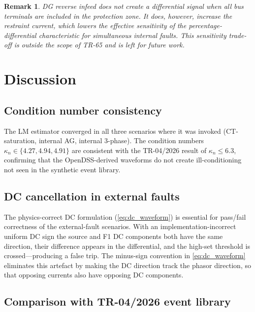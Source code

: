 \documentclass[12pt,a4paper]{article}
\newtheorem{remark}{Remark}[section]
\newcommand{\kappan}{\kappa_n}
\begin{document}
\begin{remark}
  DG reverse infeed does not create a differential signal when all bus
  terminals are included in the protection zone.  It does, however, increase
  the restraint current, which lowers the \emph{effective} sensitivity of the
  percentage-differential characteristic for simultaneous internal faults.
  This sensitivity trade-off is outside the scope of TR-65 and is left for
  future work.
\end{remark}

\section{Discussion}
\label{sec:discussion}

\subsection{Condition number consistency}
\label{sec:kappa}

The LM estimator converged in all three scenarios where it was invoked
(CT-saturation, internal AG, internal 3-phase).  The condition numbers
$\kappan \in \{4.27, 4.94, 4.91\}$ are consistent with the TR-04/2026
result of $\kappan \leq 6.3$, confirming that the OpenDSS-derived waveforms
do not create ill-conditioning not seen in the synthetic event library.

\subsection{DC cancellation in external faults}
\label{sec:dc_cancel}

The physics-correct DC formulation (\cref{eq:dc_waveform}) is essential for
pass/fail correctness of the external-fault scenarios.  With an
implementation-incorrect uniform DC sign the source and F1 DC components both
have the same direction, their difference appears in the differential, and the
high-set threshold is crossed—producing a false trip.  The minus-sign
convention in \cref{eq:dc_waveform} eliminates this artefact by making the DC
direction track the phasor direction, so that opposing currents also have
opposing DC components.

\subsection{Comparison with TR-04/2026 event library}
\label{sec:comparison}
\end{document}
